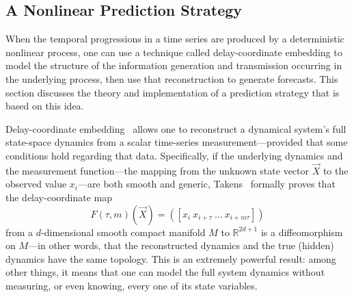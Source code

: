 \subsection{A Nonlinear Prediction Strategy}
\label{sec:lma}

When the temporal progressions in a time series are produced by a
deterministic nonlinear process, one can use a technique called
delay-coordinate embedding
%
%
to model the structure of the information generation and transmission
occurring in the underlying process, then use that reconstruction to
generate forecasts.  This section discusses the theory and
implementation of a prediction strategy that is based on this idea.

Delay-coordinate embedding~\cite{packard80,Sauer:1991lr,Takens:1981uq}
allows one to reconstruct a dynamical system's full state-space
dynamics from a scalar time-series measurement---provided that some
conditions hold regarding that data.  Specifically, if the underlying
dynamics and the measurement function---the mapping from the unknown
state vector $\vec{X}$ to the observed value $x_i$---are both smooth
and generic, Takens~\cite{Takens:1981uq} formally proves that the
delay-coordinate map
\[
F(\tau,m)(\vec{X}) = ([x_{i} ~ x_{i+\tau} ~ \dots ~x_{i+m\tau}])
\]
from a $d$-dimensional smooth compact manifold $M$ to
$\mathbb{R}^{2d+1}$ is a diffeomorphism on $M$---in other words, that
the reconstructed dynamics and the true (hidden) dynamics have the
same topology.  This is an extremely powerful result: among other
things, it means that one can model the full system dynamics without
measuring, or even knowing, every one of its state variables.  

